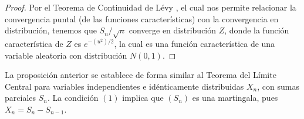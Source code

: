 \begin{proof}
Por el Teorema de Continuidad de Lévy \cite[p.~166]{jacodprotter}, el cual nos permite relacionar la convergencia puntal (de las funciones características) con la convergencia en distribución, tenemos que $S_n/\sqrt{n}$ converge en distribución  $Z$, donde la función característica de $Z$ es $e^{-(u^2)/2}$, la cual es una función característica de una variable aleatoria con distribución $N(0, 1)$.
\end{proof}

La proposición anterior se establece de forma similar al Teorema del Límite Central \cite[p.~181]{jacodprotter} para variables independientes e idénticamente distribuidas $X_n$, con sumas parciales $S_n$. La condición $(1)$ implica que $(S_n)$ es una martingala, pues $X_n = S_n - S_{n-1}$. 





